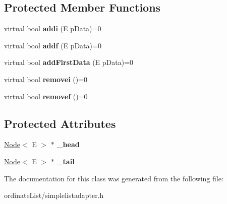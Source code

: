 \subsection*{Protected Member Functions}
\begin{DoxyCompactItemize}
\item 
\hypertarget{class_simple_list_adapter_abfd8b7cecf59921fb985f2121e246c99}{virtual bool {\bfseries addi} (E p\-Data)=0}\label{class_simple_list_adapter_abfd8b7cecf59921fb985f2121e246c99}

\item 
\hypertarget{class_simple_list_adapter_a89d3c954a3782181f871b30c7a726379}{virtual bool {\bfseries addf} (E p\-Data)=0}\label{class_simple_list_adapter_a89d3c954a3782181f871b30c7a726379}

\item 
\hypertarget{class_simple_list_adapter_a269a73b10beb87dddb3330af47334522}{virtual bool {\bfseries add\-First\-Data} (E p\-Data)=0}\label{class_simple_list_adapter_a269a73b10beb87dddb3330af47334522}

\item 
\hypertarget{class_simple_list_adapter_a9bebc8a42330e453f6e608e54de36adf}{virtual bool {\bfseries removei} ()=0}\label{class_simple_list_adapter_a9bebc8a42330e453f6e608e54de36adf}

\item 
\hypertarget{class_simple_list_adapter_a9008dff51a5a156c0929b972e59e8f1d}{virtual bool {\bfseries removef} ()=0}\label{class_simple_list_adapter_a9008dff51a5a156c0929b972e59e8f1d}

\end{DoxyCompactItemize}
\subsection*{Protected Attributes}
\begin{DoxyCompactItemize}
\item 
\hypertarget{class_simple_list_adapter_af8279a43660863dbf56cc31d27c331df}{\hyperlink{class_node}{Node}$<$ E $>$ $\ast$ {\bfseries \-\_\-head}}\label{class_simple_list_adapter_af8279a43660863dbf56cc31d27c331df}

\item 
\hypertarget{class_simple_list_adapter_aee311f35611a7a15c68ee78ea5b7394c}{\hyperlink{class_node}{Node}$<$ E $>$ $\ast$ {\bfseries \-\_\-tail}}\label{class_simple_list_adapter_aee311f35611a7a15c68ee78ea5b7394c}

\end{DoxyCompactItemize}


The documentation for this class was generated from the following file\-:\begin{DoxyCompactItemize}
\item 
ordinate\-List/simplelistadapter.\-h\end{DoxyCompactItemize}

